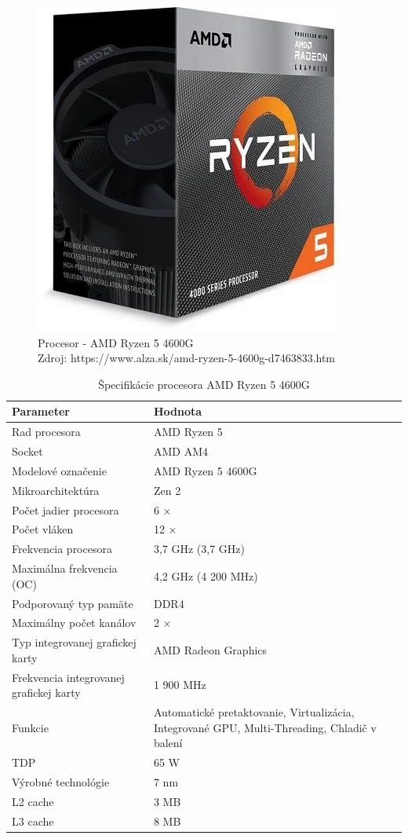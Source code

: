 \documentclass[12pt,oneside,slovak,a4paper]{article}
\begin{document}
\begin{figure}[H]
	\centering
	\captionsetup{justification=centering,margin=2cm}
	\includegraphics[scale=0.3]{./images/cpu.png} %
	\centering
	\caption{Procesor - AMD Ryzen 5 4600G \\ Zdroj: https://www.alza.sk/amd-ryzen-5-4600g-d7463833.htm}
\end{figure}

\begin{table}[h]
\centering
\begin{tabularx}{\textwidth}{|l|X|}
\hline
\textbf{Parameter} & \textbf{Hodnota} \\ \hline
Rad procesora & AMD Ryzen 5 \\ \hline
Socket & AMD AM4 \\ \hline
Modelové označenie & AMD Ryzen 5 4600G \\ \hline
Mikroarchitektúra & Zen 2 \\ \hline
Počet jadier procesora & 6 × \\ \hline
Počet vláken & 12 × \\ \hline
Frekvencia procesora & 3,7 GHz (3,7 GHz) \\ \hline
Maximálna frekvencia (OC) & 4,2 GHz (4 200 MHz) \\ \hline
Podporovaný typ pamäte & DDR4 \\ \hline
Maximálny počet kanálov & 2 × \\ \hline
Typ integrovanej grafickej karty & AMD Radeon Graphics \\ \hline
Frekvencia integrovanej grafickej karty & 1 900 MHz \\ \hline
Funkcie & Automatické pretaktovanie, Virtualizácia, Integrované GPU, Multi-Threading, Chladič v balení \\ \hline
TDP & 65 W \\ \hline
Výrobné technológie & 7 nm \\ \hline
L2 cache & 3 MB \\ \hline
L3 cache & 8 MB \\ \hline
\end{tabularx}
\caption{Špecifikácie procesora AMD Ryzen 5 4600G}
\end{table}
\end{document}
